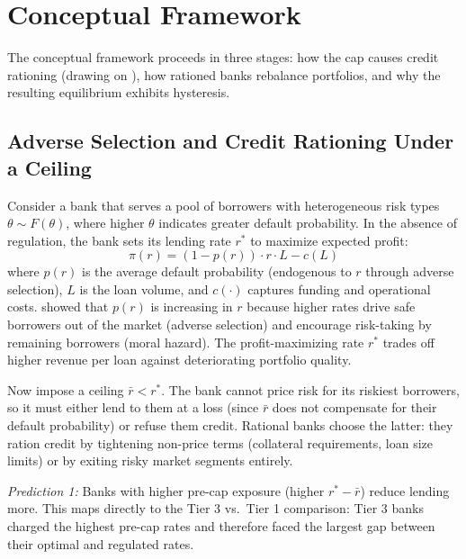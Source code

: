 \documentclass[12pt]{article}
\begin{document}
\section{Conceptual Framework}
\label{sec:framework}

The conceptual framework proceeds in three stages: how the cap causes credit rationing (drawing on \citealt{stiglitz1981credit}), how rationed banks rebalance portfolios, and why the resulting equilibrium exhibits hysteresis.

\subsection{Adverse Selection and Credit Rationing Under a Ceiling}

Consider a bank that serves a pool of borrowers with heterogeneous risk types $\theta \sim F(\theta)$, where higher $\theta$ indicates greater default probability. In the absence of regulation, the bank sets its lending rate $r^*$ to maximize expected profit:
\begin{equation}
    \pi(r) = (1 - p(r)) \cdot r \cdot L - c(L)
    \label{eq:profit}
\end{equation}
where $p(r)$ is the average default probability (endogenous to $r$ through adverse selection), $L$ is the loan volume, and $c(\cdot)$ captures funding and operational costs. \citet{stiglitz1981credit} showed that $p(r)$ is increasing in $r$ because higher rates drive safe borrowers out of the market (adverse selection) and encourage risk-taking by remaining borrowers (moral hazard). The profit-maximizing rate $r^*$ trades off higher revenue per loan against deteriorating portfolio quality.

Now impose a ceiling $\bar{r} < r^*$. The bank cannot price risk for its riskiest borrowers, so it must either lend to them at a loss (since $\bar{r}$ does not compensate for their default probability) or refuse them credit. Rational banks choose the latter: they ration credit by tightening non-price terms (collateral requirements, loan size limits) or by exiting risky market segments entirely.

\textit{Prediction 1:} Banks with higher pre-cap exposure (higher $r^* - \bar{r}$) reduce lending more. This maps directly to the Tier 3 vs.\ Tier 1 comparison: Tier 3 banks charged the highest pre-cap rates and therefore faced the largest gap between their optimal and regulated rates.
\end{document}
